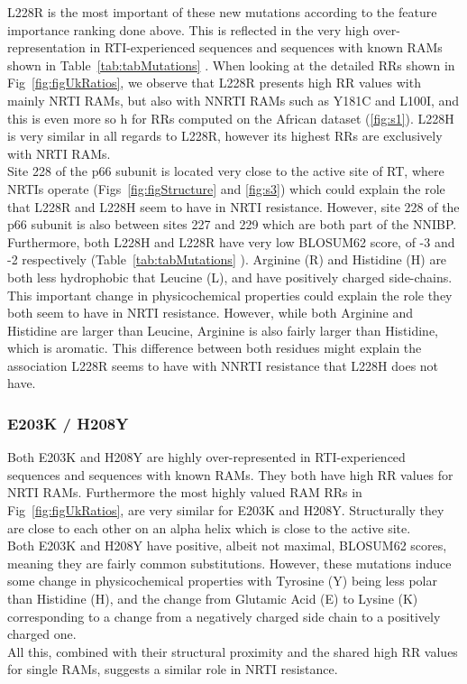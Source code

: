 \documentclass[
  11pt,
  twoside]{scrbook}
\begin{document}
L228R is the most important of these new mutations according to the
feature importance ranking done above. This is reflected in the very
high over-representation in RTI-experienced sequences and sequences with
known RAMs shown in Table~\ref{tab:tabMutations}
. When looking at the detailed RRs shown in
Fig~\ref{fig:figUkRatios}, we
observe that L228R presents high RR values with mainly NRTI RAMs, but
also with NNRTI RAMs such as Y181C and L100I, and this is even more so h
for RRs computed on the African dataset (\ref{fig:s1}). L228H is very similar in all
regards to L228R, however its highest RRs are exclusively with NRTI
RAMs.\\
Site 228 of the p66 subunit is located very close to the active site of
RT, where NRTIs operate (Figs~\ref{fig:figStructure} and \ref{fig:s3}) which could explain the role that L228R
and L228H seem to have in NRTI resistance. However, site 228 of the p66
subunit is also between sites 227 and 229 which are both part of the
NNIBP. Furthermore, both L228H and L228R have very low BLOSUM62 score,
of -3 and -2 respectively (Table~\ref{tab:tabMutations}
). Arginine (R) and Histidine (H) are both less
hydrophobic that Leucine (L), and have positively charged side-chains.
This important change in physicochemical properties could explain the
role they both seem to have in NRTI resistance. However, while both
Arginine and Histidine are larger than Leucine, Arginine is also fairly
larger than Histidine, which is aromatic. This difference between both
residues might explain the association L228R seems to have with NNRTI
resistance that L228H does not have.

\hypertarget{e203k-h208y}{%
\subsubsection{E203K / H208Y}\label{e203k-h208y}}

Both E203K and H208Y are highly over-represented in RTI-experienced
sequences and sequences with known RAMs. They both have high RR values
for NRTI RAMs. Furthermore the most highly valued RAM RRs in
Fig~\ref{fig:figUkRatios}, are
very similar for E203K and H208Y. Structurally they are close to each
other on an alpha helix which is close to the active site.\\
Both E203K and H208Y have positive, albeit not maximal, BLOSUM62 scores,
meaning they are fairly common substitutions. However, these mutations
induce some change in physicochemical properties with Tyrosine (Y) being
less polar than Histidine (H), and the change from Glutamic Acid (E) to
Lysine (K) corresponding to a change from a negatively charged side
chain to a positively charged one.\\
All this, combined with their structural proximity and the shared high
RR values for single RAMs, suggests a similar role in NRTI resistance.
\end{document}
